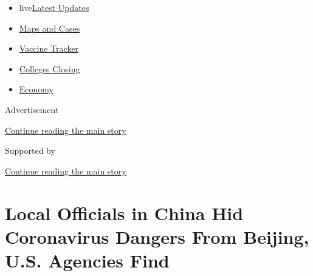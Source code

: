 \begin{itemize}
\tightlist
\item
  live\href{https://www.nytimes3xbfgragh.onion/2020/08/20/world/coronavirus-covid.html?name=styln-coronavirus-national\&region=TOP_BANNER\&variant=undefined\&block=storyline_menu_recirc\&action=click\&pgtype=Article\&impression_id=f9335940-e38c-11ea-979b-d12b386f95eb}{Latest
  Updates}
\item
  \href{https://www.nytimes3xbfgragh.onion/interactive/2020/us/coronavirus-us-cases.html?name=styln-coronavirus-national\&region=TOP_BANNER\&variant=undefined\&block=storyline_menu_recirc\&action=click\&pgtype=Article\&impression_id=f9341c90-e38c-11ea-979b-d12b386f95eb}{Maps
  and Cases}
\item
  \href{https://www.nytimes3xbfgragh.onion/interactive/2020/science/coronavirus-vaccine-tracker.html?name=styln-coronavirus-national\&region=TOP_BANNER\&variant=undefined\&block=storyline_menu_recirc\&action=click\&pgtype=Article\&impression_id=f9341c91-e38c-11ea-979b-d12b386f95eb}{Vaccine
  Tracker}
\item
  \href{https://www.nytimes3xbfgragh.onion/2020/08/19/us/colleges-closing-covid.html?name=styln-coronavirus-national\&region=TOP_BANNER\&variant=undefined\&block=storyline_menu_recirc\&action=click\&pgtype=Article\&impression_id=f93443a0-e38c-11ea-979b-d12b386f95eb}{Colleges
  Closing}
\item
  \href{https://www.nytimes3xbfgragh.onion/live/2020/08/20/business/stock-market-today-coronavirus?name=styln-coronavirus-national\&region=TOP_BANNER\&variant=undefined\&block=storyline_menu_recirc\&action=click\&pgtype=Article\&impression_id=f93443a1-e38c-11ea-979b-d12b386f95eb}{Economy}
\end{itemize}

Advertisement

\protect\hyperlink{after-top}{Continue reading the main story}

Supported by

\protect\hyperlink{after-sponsor}{Continue reading the main story}

\hypertarget{local-officials-in-china-hid-coronavirus-dangers-from-beijing-us-agencies-find}{%
\section{Local Officials in China Hid Coronavirus Dangers From Beijing,
U.S. Agencies
Find}\label{local-officials-in-china-hid-coronavirus-dangers-from-beijing-us-agencies-find}}

